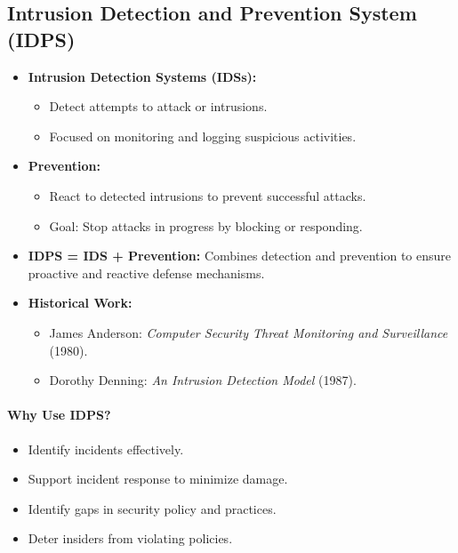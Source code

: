 \subsection{Intrusion Detection and Prevention System (IDPS)}
\begin{itemize}
    \item \textbf{Intrusion Detection Systems (IDSs):}
    \begin{itemize}
        \item Detect attempts to attack or intrusions.
        \item Focused on monitoring and logging suspicious activities.
    \end{itemize}
    \item \textbf{Prevention:}
    \begin{itemize}
        \item React to detected intrusions to prevent successful attacks.
        \item Goal: Stop attacks in progress by blocking or responding.
    \end{itemize}
    \item \textbf{IDPS = IDS + Prevention:} Combines detection and prevention to ensure proactive and reactive defense mechanisms.
    \item \textbf{Historical Work:}
    \begin{itemize}
        \item James Anderson: \emph{Computer Security Threat Monitoring and Surveillance} (1980).
        \item Dorothy Denning: \emph{An Intrusion Detection Model} (1987).
    \end{itemize}
\end{itemize}
\paragraph{Why Use IDPS?}
\begin{itemize}
    \item Identify incidents effectively.
    \item Support incident response to minimize damage.
    \item Identify gaps in security policy and practices.
    \item Deter insiders from violating policies.
\end{itemize}

